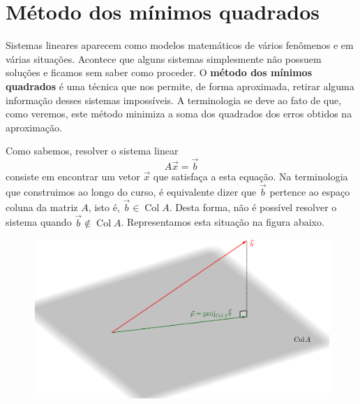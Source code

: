 

\providecommand{\dir}{..}


%
	



\section{Método dos mínimos quadrados}

Sistemas lineares aparecem como modelos matemáticos de vários fenômenos e em várias situações. Acontece que alguns sistemas simplesmente não possuem soluções e ficamos sem saber como proceder. O \textbf{método dos mínimos quadrados} é uma técnica que nos permite, de forma aproximada, retirar alguma informação desses sistemas impossíveis. A terminologia se deve ao fato de que, como veremos, este método minimiza a soma dos quadrados dos erros obtidos na aproximação.

Como sabemos, resolver o sistema linear
\begin{equation}
A \vec{x} = \vec{b}
\end{equation} consiste em encontrar um vetor $\vec{x}$ que satisfaça a esta equação. Na terminologia que construimos ao longo do curso, é equivalente dizer que $\vec{b}$ pertence ao espaço coluna da matriz $A$, isto é, $\vec{b} \in \operatorname{Col} A$. Desta forma, não é possível resolver o sistema quando $\vec{b} \not\in \operatorname{Col} A$. Representamos esta situação na figura abaixo.
\begin{figure}[h!]
  \begin{center}
    \includegraphics[width=0.8\linewidth]{Semana13/semana13-proj-col}
  \end{center}
\end{figure}

